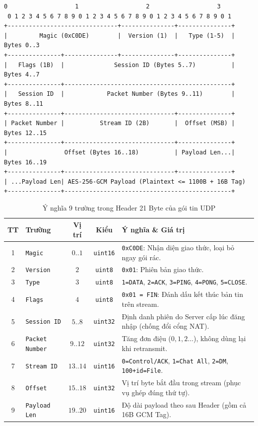\begin{lstlisting}[numbers=none]
 0                   1                   2                   3
 0 1 2 3 4 5 6 7 8 9 0 1 2 3 4 5 6 7 8 9 0 1 2 3 4 5 6 7 8 9 0 1
+-------------------------------+---------------+---------------+
|         Magic (0xC0DE)        |  Version (1)  |   Type (1-5)  |  Bytes 0..3
+---------------+---------------+---------------+---------------+
|   Flags (1B)  |              Session ID (Bytes 5..7)          |  Bytes 4..7
+---------------+-----------------------------------------------+
|   Session ID  |            Packet Number (Bytes 9..11)        |  Bytes 8..11
+---------------+-------------------------------+---------------+
| Packet Number |          Stream ID (2B)       |  Offset (MSB) |  Bytes 12..15
+---------------+-------------------------------+---------------+
|                Offset (Bytes 16..18)          | Payload Len...|  Bytes 16..19
+---------------+-------------------------------+---------------+
| ...Payload Len| AES-256-GCM Payload (Plaintext <= 1100B + 16B Tag)
+---------------+-----------------------------------------------+
\end{lstlisting}

\begin{table}[H]
\centering
\caption{Ý nghĩa 9 trường trong Header 21 Byte của gói tin UDP}
\label{tab:udp_header}
\renewcommand{\arraystretch}{1.2}
\begin{tabularx}{\textwidth}{|c|l|c|c|X|}
\hline
\textbf{TT} & \textbf{Trường} & \textbf{Vị trí} & \textbf{Kiểu} & \textbf{Ý nghĩa \& Giá trị} \\
\hline
1 & \texttt{Magic} & $0..1$ & \texttt{uint16} & \texttt{0xC0DE}: Nhận diện giao thức, loại bỏ ngay gói rác. \\
\hline
2 & \texttt{Version} & $2$ & \texttt{uint8} & \texttt{0x01}: Phiên bản giao thức. \\
\hline
3 & \texttt{Type} & $3$ & \texttt{uint8} & \texttt{1=DATA}, \texttt{2=ACK}, \texttt{3=PING}, \texttt{4=PONG}, \texttt{5=CLOSE}. \\
\hline
4 & \texttt{Flags} & $4$ & \texttt{uint8} & \texttt{0x01 = FIN}: Đánh dấu kết thúc bản tin trên stream. \\
\hline
5 & \texttt{Session ID} & $5..8$ & \texttt{uint32} & Định danh phiên do Server cấp lúc đăng nhập (chống đổi cổng NAT). \\
\hline
6 & \texttt{Packet Number} & $9..12$ & \texttt{uint32} & Tăng đơn điệu ($0, 1, 2\dots$), không dùng lại khi retransmit. \\
\hline
7 & \texttt{Stream ID} & $13..14$ & \texttt{uint16} & \texttt{0=Control/ACK}, \texttt{1=Chat All}, \texttt{2=DM}, \texttt{100+id=File}. \\
\hline
8 & \texttt{Offset} & $15..18$ & \texttt{uint32} & Vị trí byte bắt đầu trong stream (phục vụ ghép đúng thứ tự). \\
\hline
9 & \texttt{Payload Len} & $19..20$ & \texttt{uint16} & Độ dài payload theo sau Header (gồm cả 16B GCM Tag). \\
\hline
\end{tabularx}
\end{table}

